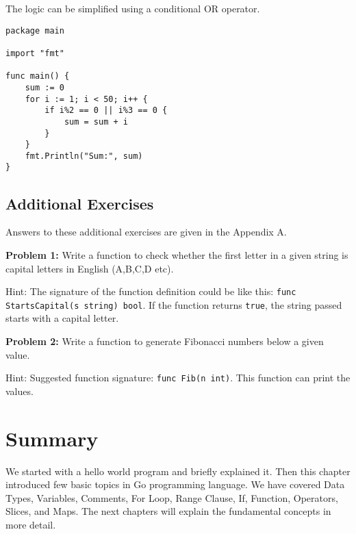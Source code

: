 The logic can be simplified using a conditional OR operator.

\begin{lstlisting}[numbers=none]
package main

import "fmt"

func main() {
    sum := 0
    for i := 1; i < 50; i++ {
        if i%2 == 0 || i%3 == 0 {
            sum = sum + i
        }
    }
    fmt.Println("Sum:", sum)
}
\end{lstlisting}

\subsection{Additional Exercises}

Answers to these additional exercises are given in the Appendix A.

\textbf{Problem 1:} Write a function to check whether the first letter in a
given string is capital letters in English (A,B,C,D etc).

Hint: The signature of the function definition could be like this:
\texttt{func StartsCapital(s string) bool}.  If the function returns
\texttt{true}, the string passed starts with a capital letter.

\textbf{Problem 2:} Write a function to generate Fibonacci numbers below a
given value.

Hint: Suggested function signature: \texttt{func Fib(n int)}.  This
function can print the values.

\section*{Summary}

We started with a hello world program and briefly explained it.  Then
this chapter introduced few basic topics in Go programming language.
We have covered Data Types, Variables, Comments, For Loop, Range
Clause, If, Function, Operators, Slices, and Maps.  The next chapters
will explain the fundamental concepts in more detail.
